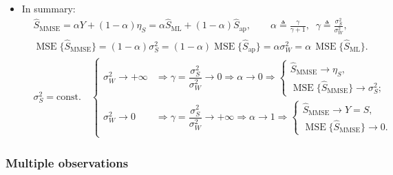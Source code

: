 \begin{itemize}
\item In summary:
\begin{align*}
&\hat{S}_{\text{MMSE}}
= \alpha Y + (1-\alpha)\eta_S
 = \alpha \hat{S}_{\text{ML}} + (1-\alpha)\hat{S}_{\text{ap}},
\qquad
\alpha \triangleq \frac{\gamma}{\gamma+1},
\;\; \gamma \triangleq \frac{\sigma_S^{2}}{\sigma_W^{2}}, \\[8pt]
&\operatorname{MSE}\{\hat{S}_{\text{MMSE}}\}
= (1-\alpha)\sigma_S^{2}
 = (1-\alpha)\operatorname{MSE}\{\hat{S}_{\text{ap}}\}
 = \alpha\sigma_W^{2}
 = \alpha\,\operatorname{MSE}\{\hat{S}_{\text{ML}}\}. \\[10pt]
&\sigma_S^{2} = \text{const.}\quad
\begin{cases}
\sigma_W^{2} \to +\infty
 &\Rightarrow \gamma = \dfrac{\sigma_S^{2}}{\sigma_W^{2}} \to 0
  \Rightarrow \alpha \to 0
  \Rightarrow
  \begin{cases}
  \hat{S}_{\text{MMSE}} \to \eta_S, \\[8pt]
  \operatorname{MSE}\{\hat{S}_{\text{MMSE}}\} \to \sigma_S^{2};
  \end{cases} \\[20pt]
\sigma_W^{2} \to 0
 &\Rightarrow \gamma = \dfrac{\sigma_S^{2}}{\sigma_W^{2}} \to +\infty
  \Rightarrow \alpha \to 1
  \Rightarrow
  \begin{cases}
  \hat{S}_{\text{MMSE}} \to Y = S, \\[8pt]
  \operatorname{MSE}\{\hat{S}_{\text{MMSE}}\} \to 0.
  \end{cases}
\end{cases}
\end{align*}
\end{itemize}
\subsubsection{Multiple observations}

